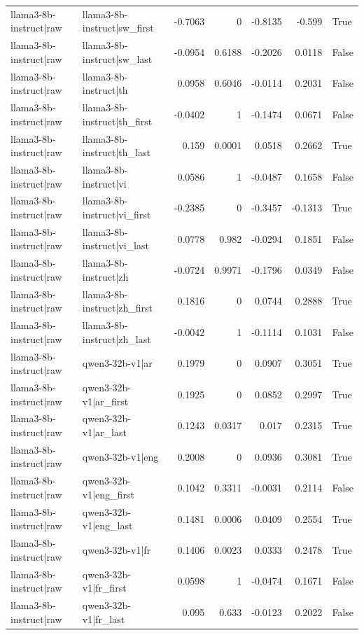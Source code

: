 \begin{table}
\begin{tabular}{l l r r r r l}
llama3-8b-instruct|raw & llama3-8b-instruct|sw_first & -0.7063 & 0 & -0.8135 & -0.599 & True \\
llama3-8b-instruct|raw & llama3-8b-instruct|sw_last & -0.0954 & 0.6188 & -0.2026 & 0.0118 & False \\
llama3-8b-instruct|raw & llama3-8b-instruct|th & 0.0958 & 0.6046 & -0.0114 & 0.2031 & False \\
llama3-8b-instruct|raw & llama3-8b-instruct|th_first & -0.0402 & 1 & -0.1474 & 0.0671 & False \\
llama3-8b-instruct|raw & llama3-8b-instruct|th_last & 0.159 & 0.0001 & 0.0518 & 0.2662 & True \\
llama3-8b-instruct|raw & llama3-8b-instruct|vi & 0.0586 & 1 & -0.0487 & 0.1658 & False \\
llama3-8b-instruct|raw & llama3-8b-instruct|vi_first & -0.2385 & 0 & -0.3457 & -0.1313 & True \\
llama3-8b-instruct|raw & llama3-8b-instruct|vi_last & 0.0778 & 0.982 & -0.0294 & 0.1851 & False \\
llama3-8b-instruct|raw & llama3-8b-instruct|zh & -0.0724 & 0.9971 & -0.1796 & 0.0349 & False \\
llama3-8b-instruct|raw & llama3-8b-instruct|zh_first & 0.1816 & 0 & 0.0744 & 0.2888 & True \\
llama3-8b-instruct|raw & llama3-8b-instruct|zh_last & -0.0042 & 1 & -0.1114 & 0.1031 & False \\
llama3-8b-instruct|raw & qwen3-32b-v1|ar & 0.1979 & 0 & 0.0907 & 0.3051 & True \\
llama3-8b-instruct|raw & qwen3-32b-v1|ar_first & 0.1925 & 0 & 0.0852 & 0.2997 & True \\
llama3-8b-instruct|raw & qwen3-32b-v1|ar_last & 0.1243 & 0.0317 & 0.017 & 0.2315 & True \\
llama3-8b-instruct|raw & qwen3-32b-v1|eng & 0.2008 & 0 & 0.0936 & 0.3081 & True \\
llama3-8b-instruct|raw & qwen3-32b-v1|eng_first & 0.1042 & 0.3311 & -0.0031 & 0.2114 & False \\
llama3-8b-instruct|raw & qwen3-32b-v1|eng_last & 0.1481 & 0.0006 & 0.0409 & 0.2554 & True \\
llama3-8b-instruct|raw & qwen3-32b-v1|fr & 0.1406 & 0.0023 & 0.0333 & 0.2478 & True \\
llama3-8b-instruct|raw & qwen3-32b-v1|fr_first & 0.0598 & 1 & -0.0474 & 0.1671 & False \\
llama3-8b-instruct|raw & qwen3-32b-v1|fr_last & 0.095 & 0.633 & -0.0123 & 0.2022 & False \\

\end{tabular}
\end{table}
